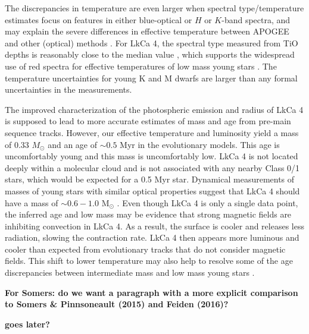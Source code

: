 \documentclass[twocolumn]{emulateapj}%
\begin{document}
The discrepancies in temperature are even larger when spectral type/temperature estimates focus on features in either blue-optical or $H$ or $K$-band spectra, and may explain the severe differences in effective temperature between APOGEE and other (optical) methods \citep{cottaar14}.  For LkCa 4, the spectral type measured from TiO depths is reasonably close to the median value \citep{herczeg14}, which supports the widespread use of red spectra for effective temperatures of low mass young stars \citep[e.g.][]{luhman03}.  The temperature uncertainties for young K and M dwarfs are larger than any formal uncertainties in the measurements.

The improved characterization of the photospheric emission and radius of LkCa 4 is supposed to lead to more accurate estimates of mass and age from pre-main sequence tracks.  However, our effective temperature and luminosity yield a mass of 0.33 $M_\odot$ and an age of $\sim 0.5$ Myr in the \citet{baraffe15} evolutionary models.  This age is uncomfortably young and this mass is uncomfortably low.  LkCa 4 is not located deeply within a molecular cloud and is not associated with any nearby Class 0/1 stars, which would be expected for a 0.5 Myr star.  Dynamical measurements of masses of young stars with similar optical properties suggest that LkCa 4 should have a mass of $\sim 0.6-1.0$ M$_\odot$ \citep[e.g.][]{guilloteau14,czekala16,rizzuto16}.  Even though LkCa 4 is only a single data point, the inferred age and low mass may be evidence that strong magnetic fields are inhibiting convection in LkCa 4.  As a result, the surface is cooler and releases less radiation, slowing the contraction rate.  LkCa 4 then appears more luminous and cooler than expected from evolutionary tracks that do not consider magnetic fields.   This shift to lower temperature may also help to resolve some of the age discrepancies between intermediate mass and low mass young stars \citep[e.g.][]{herczeg15}.

{\bf For Somers:  do we want a paragraph with a more explicit comparison to Somers \& Pinnsoneault (2015) and Feiden (2016)?}



{\bf goes later?}
\end{document}
